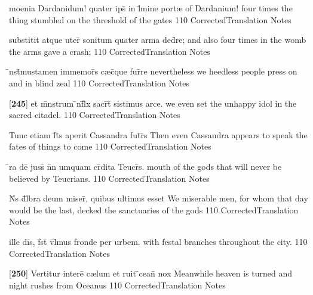 \latline
  {moenia Dardanidum! quater ips\={} in l\={\macron {\i}}mine port{\ae}}
  { of Dardanium!  four times the thing stumbled on the threshold of the gates }
  {110}
  { CorrectedTranslation }
  { Notes }


\latline
  {substitit atque uter\={} sonitum quater arma ded\={}re;}
  { and also four times in the womb the arms gave a crash; }
  {110}
  { CorrectedTranslation }
  { Notes }


\latline
  {\={\macron {\i}}nst\={}mustamen immemor\={}s c{\ae}c\={\macron {\i}}que fur\={}re}
  { nevertheless we heedless people press on and in blind zeal }
  {110}
  { CorrectedTranslation }
  { Notes }


\latline
  {[\textbf{245}] et m\={}nstrum \={\macron {\i}}nf\={}l\={\macron {\i}}x sacr\={}t\={} sistimus arce.}
  { we even set the unhappy idol in the sacred citadel. }
  {110}
  { CorrectedTranslation }
  { Notes }


\latline
  {Tunc etiam f\={}t\={\macron {\i}}s aperit Cassandra fut\={}r\={\macron {\i}}s}
  { Then even Cassandra appears to speak the fates of things to come }
  {110}
  { CorrectedTranslation }
  { Notes }


\latline
  {\={}ra de\={\macron {\i}}  juss\={} n\={}n umquam cr\={}dita Teucr\={\macron {\i}}s.}
  { mouth of the gods that will never be believed by Teucrians.  }
  {110}
  { CorrectedTranslation }
  { Notes }


\latline
  {N\={}s d\={}l\={}bra deum miser\={\macron {\i}}, quibus ultimus esset}
  { We miserable men, for whom that day would be the last, decked the sanctuaries of the gods }
  {110}
  { CorrectedTranslation }
  { Notes }


\latline
  {ille di\={}s, f\={}st\={} v\={}l\={}mus fronde per urbem.}
  { with festal branches throughout the city. }
  {110}
  { CorrectedTranslation }
  { Notes }


\latline
  {[\textbf{250}] Vertitur intere\={} c{\ae}lum et ruit \={}cean\={} nox}
  { Meanwhile heaven is turned and night rushes from Oceanus }
  {110}
  { CorrectedTranslation }
  { Notes }
